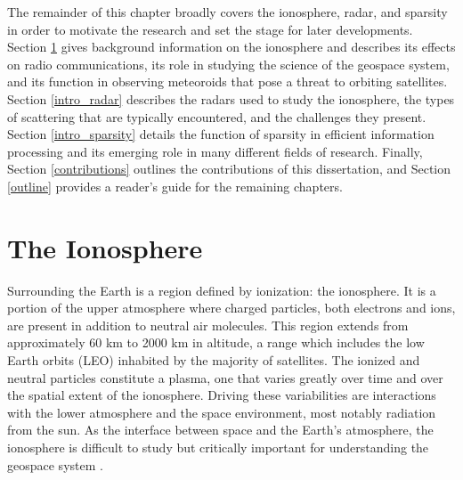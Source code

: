 The remainder of this chapter broadly covers the ionosphere, radar, and sparsity in order to motivate the research and set the stage for later developments. Section \ref{intro_ionosphere} gives background information on the ionosphere and describes its effects on radio communications, its role in studying the science of the geospace system, and its function in observing meteoroids that pose a threat to orbiting satellites. Section \ref{intro_radar} describes the radars used to study the ionosphere, the types of scattering that are typically encountered, and the challenges they present. Section \ref{intro_sparsity} details the function of sparsity in efficient information processing and its emerging role in many different fields of research. Finally, Section \ref{contributions} outlines the contributions of this dissertation, and Section \ref{outline} provides a reader's guide for the remaining chapters.

\section{The Ionosphere}
\label{intro_ionosphere}
Surrounding the Earth is a region defined by ionization: the ionosphere. It is a portion of the upper atmosphere where charged particles, both electrons and ions, are present in addition to neutral air molecules. This region extends from approximately 60 km to 2000 km in altitude, a range which includes the low Earth orbits (LEO) inhabited by the majority of satellites. The ionized and neutral particles constitute a plasma, one that varies greatly over time and over the spatial extent of the ionosphere. Driving these variabilities are interactions with the lower atmosphere and the space environment, most notably radiation from the sun. As the interface between space and the Earth's atmosphere, the ionosphere is difficult to study but critically important for understanding the geospace system \autocite{CEDAR11}.

